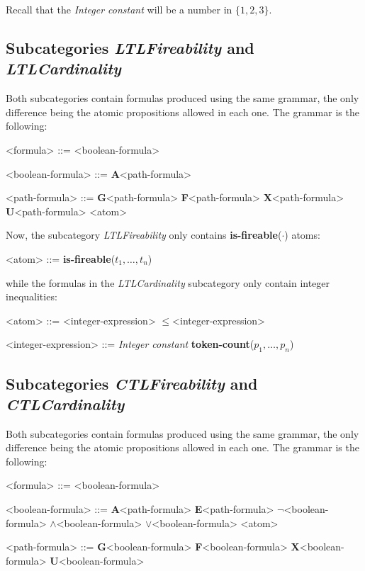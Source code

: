 \documentclass[10pt,english,a4paper]{article}
\newcommand\set[1]           {{\{ #1 \mathclose \}}}
\newcommand\ctla             {\textbf{A}\xspace}
\newcommand\ctle             {\textbf{E}\xspace}
\newcommand\ltlf             {\textbf{F}\xspace}
\newcommand\ltlg             {\textbf{G}\xspace}
\newcommand\ltlx             {\textbf{X}\xspace}
\newcommand\ltlu             {\textbf{U}\xspace}
\newcommand\logicnot         {\boldmath$\lnot$\xspace}
\newcommand\logicand         {\boldmath$\land$\xspace}
\newcommand\logicor          {\boldmath$\lor$\xspace}
\newcommand\atomleq          {\boldmath$\leq$\xspace}
\newcommand\atomisfire[1]    {\textbf{is-fireable}(#1)}
\newcommand\atomtokenscnt[1] {\textbf{token-count}(#1)}
\begin{document}
Recall that the \textit{Integer constant} will be a number in $\set{1,2,3}$.


\subsection{Subcategories \textit{LTLFireability} and \textit{LTLCardinality}}

Both subcategories contain formulas produced using the same grammar, the
only difference being the atomic propositions allowed in each one.
The grammar is the following:

\begin{grammar}

<formula> ::= <boolean-formula>

<boolean-formula> ::= \ctla <path-formula>

<path-formula> ::=
     \ltlg <path-formula>
\alt \ltlf <path-formula>
\alt \ltlx <path-formula>
 \ltlu <path-formula>
\alt <atom>

\end{grammar}

Now, the subcategory \emph{LTLFireability} only contains
\atomisfire{$\cdot$} atoms:

\begin{grammar}
<atom> ::= \atomisfire{$t_1, \ldots, t_n$}
\end{grammar}

while the formulas in the \emph{LTLCardinality} subcategory only contain
integer inequalities:

\begin{grammar}
<atom> ::= <integer-expression> \atomleq <integer-expression>

<integer-expression> ::= \textit{Integer constant}
\alt \atomtokenscnt{$p_1, \ldots, p_n$}
\end{grammar}


\subsection{Subcategories \emph{CTLFireability} and \emph{CTLCardinality}}

Both subcategories contain formulas produced using the same grammar, the
only difference being the atomic propositions allowed in each one.
The grammar is the following:

\begin{grammar}
<formula> ::= <boolean-formula>

<boolean-formula> ::=
     \ctla <path-formula>
\alt \ctle <path-formula>
\alt \logicnot <boolean-formula>
 \logicand <boolean-formula>
 \logicor <boolean-formula>
\alt <atom>

<path-formula> ::=
     \ltlg <boolean-formula>
\alt \ltlf <boolean-formula>
\alt \ltlx <boolean-formula>
 \ltlu <boolean-formula>
\end{grammar}
\end{document}

